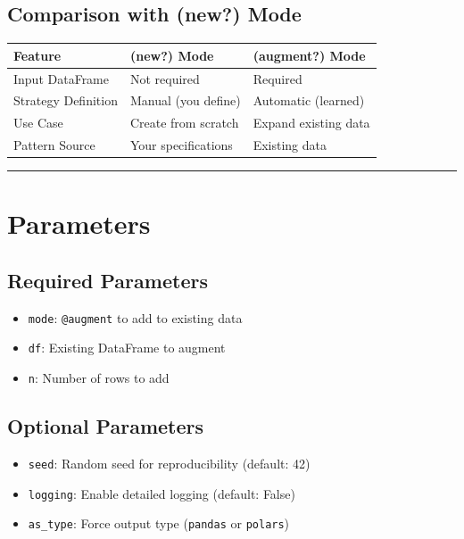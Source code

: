 \documentclass[
  letterpaper,
]{scrbook}
\providecommand{\tightlist}{%
  \setlength{\itemsep}{0pt}\setlength{\parskip}{0pt}}
\begin{document}
\subsection{\texorpdfstring{Comparison with (\textbf{new?})
Mode}{Comparison with (new?) Mode}}\label{comparison-with-new-mode}

\begin{longtable}[]{@{}lll@{}}
\toprule\noalign{}
Feature & (\textbf{new?}) Mode & (\textbf{augment?}) Mode \\
\midrule\noalign{}
\endhead
\bottomrule\noalign{}
\endlastfoot
Input DataFrame & Not required & Required \\
Strategy Definition & Manual (you define) & Automatic (learned) \\
Use Case & Create from scratch & Expand existing data \\
Pattern Source & Your specifications & Existing data \\
\end{longtable}

\begin{center}\rule{0.5\linewidth}{0.5pt}\end{center}

\section{Parameters}\label{parameters-2}

\subsection{Required Parameters}\label{required-parameters-2}

\begin{itemize}
\tightlist
\item
  \texttt{mode}: \texttt{\textquotesingle{}@augment\textquotesingle{}}
  to add to existing data
\item
  \texttt{df}: Existing DataFrame to augment
\item
  \texttt{n}: Number of rows to add
\end{itemize}

\subsection{Optional Parameters}\label{optional-parameters-2}

\begin{itemize}
\tightlist
\item
  \texttt{seed}: Random seed for reproducibility (default: 42)
\item
  \texttt{logging}: Enable detailed logging (default: False)
\item
  \texttt{as\_type}: Force output type
  (\texttt{\textquotesingle{}pandas\textquotesingle{}} or
  \texttt{\textquotesingle{}polars\textquotesingle{}})
\end{itemize}
\end{document}
